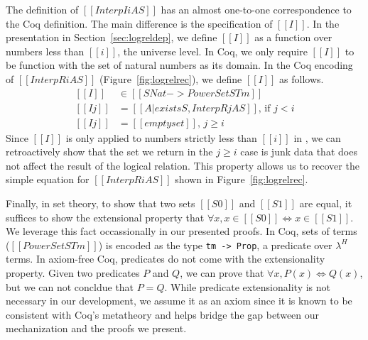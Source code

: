 \documentclass[acmsmall,screen=true,
\ifpublic review=false\else,review=true\fi
  ,anonymous=\ifanonymous true\else false\fi]{acmart}
\newcommand{\lang}{$\lambda^H$\xspace}
\begin{document}
The definition of $[[Interp I i A S]]$ has an almost one-to-one
correspondence to the Coq definition. The main difference is the
specification of $[[I]]$. In the presentation in
Section~\ref{sec:logreldep}, we define $[[I]]$ as a function over
numbers less than $[[i]]$, the universe level. In Coq, we only require
$[[I]]$ to be function with the set of natural numbers as its domain.
In the Coq encoding of $[[InterpR i A S]]$ (Figure~\ref{fig:logrelrec}), we define $[[I]]$ as follows.
\begin{equation*}
  \begin{split}
    [[I]]   &\in [[SNat -> PowerSet STm]] \\
    [[I j]] &= [[{A | exists S , InterpR j A S}]] \text{, if } j < i \\
    [[I j]] &= [[emptyset]] \text{, } j \geq i
  \end{split}
\end{equation*}
Since $[[I]]$ is only applied to numbers strictly less than $[[i]]$ in
, we can retroactively show that the set we return in the $j
\geq i$ case is junk data that does not affect the result of the logical
relation. This property allows us to recover the simple equation for $[[InterpR i A S]]$ shown in Figure~\ref{fig:logrelrec}.

Finally, in set theory, to show that two sets $[[S0]]$ and $[[S1]]$
are equal, it suffices to show the extensional property that $\forall
x, x \in [[S0]] \iff x \in [[S1]]$. We leverage this fact
occassionally in our presented proofs.
In Coq, sets of terms ($[[PowerSet STm]]$) is encoded as the type \texttt{tm ->
Prop}, a predicate over \lang{} terms.
In axiom-free Coq, predicates do not come with the extensionality
property. Given two predicates $P$ and $Q$, we can prove that $\forall
x, P(x) \iff Q(x)$, but we can not concldue that $P = Q$. While
predicate extensionality is not necessary in our development, we
assume it as an axiom since it is known to be consistent with Coq's
metatheory and helps bridge the gap between our mechanization and the
proofs we present.


\end{document}

